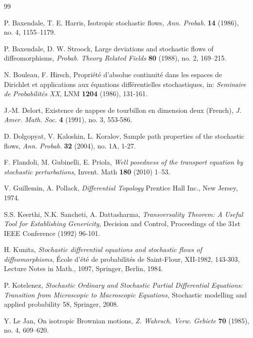 \documentclass[11pt,a4paper]{article}%
\begin{document}
\begin{thebibliography}{99}                                                                                               %


P. Baxendale, T. E. Harris, Isotropic stochastic flows,
\textit{Ann. Probab.} \textbf{14} (1986), no. 4, 1155--1179.

P. Baxendale, D. W. Stroock, Large deviations and
stochastic flows of diffeomorphisms, \textit{Probab. Theory Related Fields}
\textbf{80} (1988), no. 2, 169--215.

N. Bouleau, F. Hirsch, Propri\'{e}t\'{e} d'absolue
continuit\'{e} dans les espaces de Dirichlet et applications aux \'{e}quations
diff\'{e}rentielles stochastiques, in: \textit{Seminaire de Probabilit\'{e}s
XX}, LNM \textbf{1204} (1986), 131-161.

J.-M. Delort, Existence de nappes de tourbillon en dimension
deux (French), \textit{J. Amer. Math. Soc.} \textbf{4} (1991), no. 3, 553-586.

D. Dolgopyat, V. Kaloshin, L. Koralov, Sample path properties
of the stochastic flows, \textit{Ann. Probab.} \textbf{32} (2004), no. 1A, 1-27.

F. Flandoli, M. Gubinelli, E. Priola,  \textit{Well
posedness of the transport equation by stochastic perturbations,}  Invent.
Math \textbf{180} (2010) 1--53.

V. Guillemin, A. Pollack, \textit{ Differential Topology}
Prentice Hall Inc., New Jersey, 1974.

S.S. Keerthi, N.K. Sancheti, A. Dattasharma,
\textit{Transversality Theorem: A Useful Tool for Establishing Genericity, }
Decision and Control, Proceedings of the 31st IEEE Conference (1992) 96-101.

H. Kunita, \textit{Stochastic differential equations and
stochastic flows of diffeomorphisms}, \'{E}cole d'\'{e}t\'{e} de
probabilit\'{e}s de Saint-Flour, XII-1982, 143-303, Lecture Notes in Math.,
1097, Springer, Berlin, 1984.

P. Kotelenez,  \textit{ Stochastic Ordinary and Stochastic
Partial Differential Equations: Transition from Microscopic to Macroscopic
Equations,} Stochastic modelling and applied probability 58,  Springer, 2008.

Y. Le Jan, On isotropic Brownian motions, \textit{Z. Wahrsch.
Verw. Gebiete} \textbf{70} (1985), no. 4, 609--620.


\end{thebibliography}
\end{document}
